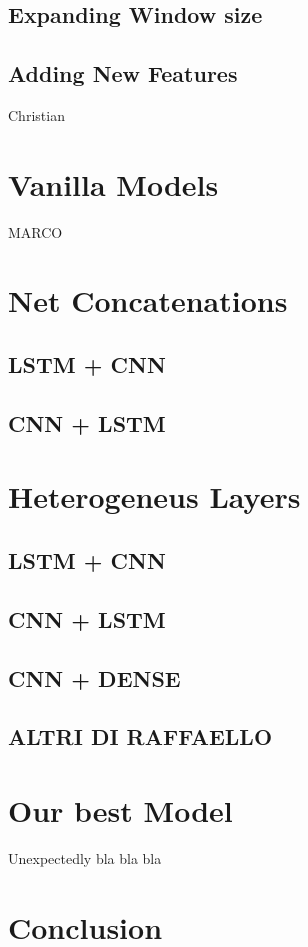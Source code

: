 \documentclass[11pt]{article}
\begin{document}
\subsection{Expanding Window size}
\subsection{Adding New Features}
Christian
\section{Vanilla Models}
MARCO
\section{Net Concatenations}
\subsection{LSTM + CNN}
\subsection{CNN + LSTM}

\section{Heterogeneus Layers}
\subsection{LSTM + CNN}
\subsection{CNN + LSTM}

\subsection{CNN + DENSE}
\subsection{ALTRI DI RAFFAELLO}

\section{Our best Model}
Unexpectedly bla bla bla

\section{Conclusion}
\end{document}
